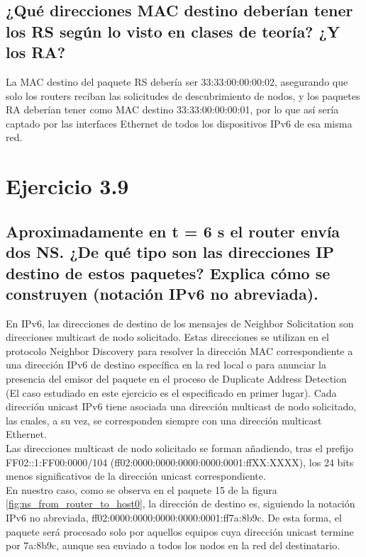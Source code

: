 \subsection{¿Qué direcciones MAC destino deberían tener los RS según lo visto en clases de teoría? ¿Y los RA?}

La MAC destino del paquete RS debería ser 33:33:00:00:00:02, asegurando que solo los routers reciban las solicitudes de descubrimiento de nodos, y los paquetes RA deberían tener como MAC destino 33:33:00:00:00:01, por lo que así sería captado por las interfaces Ethernet de todos los dispositivos IPv6 de esa misma red.

\section{Ejercicio 3.9}
\subsection{ Aproximadamente en t = 6 s el router envía dos NS. ¿De qué tipo son las direcciones IP destino de estos
paquetes? Explica cómo se construyen (notación IPv6 no abreviada).}

En IPv6, las direcciones de destino de los mensajes de Neighbor Solicitation son direcciones multicast de nodo solicitado. Estas direcciones se utilizan en el protocolo Neighbor Discovery para resolver la dirección MAC correspondiente a una dirección IPv6 de destino específica en la red local o para anunciar la presencia del emisor del paquete en el proceso de Duplicate Address Detection (El caso estudiado en este ejercicio es el especificado en primer lugar). Cada dirección unicast IPv6 tiene asociada una dirección multicast de nodo solicitado, las cuales, a su vez, se corresponden siempre con una dirección multicast Ethernet.\\
Las direcciones multicast de nodo solicitado se forman añadiendo, tras el prefijo \\
FF02::1:FF00:0000/104 (ff02:0000:0000:0000:0000:0001:ffXX:XXXX), los 24 bits menos significativos de la dirección unicast correspondiente. \\
En nuestro caso, como se observa en el paquete 15 de la figura \ref{fig:ns_from_router_to_host0}, la dirección de destino es, siguiendo la notación IPv6 no abreviada, 
ff02:0000:0000:0000:0000:0001:ff7a:8b9c. De esta forma, el paquete será procesado solo por aquellos equipos cuya dirección unicast termine por 7a:8b9c, aunque sea enviado a todos los nodos en la red del destinatario.

